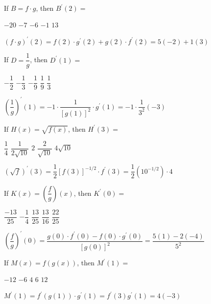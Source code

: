 \question
If $B=f \cdot g$, then $B^{\prime}(2)=$
\begin{choices}
  \choice $-20$
  \CorrectChoice $-7$
  \choice $-6$
  \choice $-1$
  \choice $13$
\end{choices}
\begin{solution}
$(f \cdot g)^{\prime}(2)=f(2) \cdot g^{\prime}(2)+g(2) \cdot f^{\prime}(2)=5(-2)+1(3)$
\end{solution}





\newpage




\question
If $D=\dfrac{1}{g}$, then $D^{\prime}(1)=$
\begin{choices}
  \choice $-\dfrac{1}{2}$
  \choice $-\dfrac{1}{3}$
  \choice $-\dfrac{1}{9}$
  \choice $\dfrac{1}{9}$
  \CorrectChoice $\dfrac{1}{3}$
\end{choices}
\begin{solution}
$\left(\dfrac{1}{g}\right)^{\prime}(1)=-1 \cdot \dfrac{1}{[g(1)]^{2}} \cdot g^{\prime}(1)=-1 \cdot \dfrac{1}{3^{2}}(-3)$
\end{solution}

\question
If $H(x)=\sqrt{f(x)}$, then $H^{\prime}(3)=$
\begin{choices}
  \choice $\dfrac{1}{4}$
  \choice $\dfrac{1}{2 \sqrt{10}}$
  \choice $2$
  \CorrectChoice $\dfrac{2}{\sqrt{10}}$
  \choice $4 \sqrt{10}$
\end{choices}
\begin{solution}
$(\sqrt{f})^{\prime}(3)=\dfrac{1}{2}[f(3)]^{-1 / 2} \cdot f^{\prime}(3)=\dfrac{1}{2}\left(10^{-1 / 2}\right) \cdot 4$
\end{solution}

\question
If $K(x)=\left(\dfrac{f}{g}\right)(x)$, then $K^{\prime}(0)=$
\begin{choices}
  \choice $\dfrac{-13}{25}$
  \choice $-\dfrac{1}{4}$
  \CorrectChoice $\dfrac{13}{25}$
  \choice $\dfrac{13}{16}$
  \choice $\dfrac{22}{25}$
\end{choices}
\begin{solution}
$\left(\dfrac{f}{g}\right)^{\prime}(0)=\dfrac{g(0) \cdot f^{\prime}(0)-f(0) \cdot g^{\prime}(0)}{[g(0)]^{2}}=\dfrac{5(1)-2(-4)}{5^{2}}$
\end{solution}


\newpage



\question
If $M(x)=f(g(x))$, then $M^{\prime}(1)=$
\begin{choices}
  \CorrectChoice $-12$
  \choice $-6$
  \choice $4$
  \choice $6$
  \choice $12$
\end{choices}
\begin{solution}
$M^{\prime}(1)=f^{\prime}(g(1)) \cdot g^{\prime}(1)=f^{\prime}(3) g^{\prime}(1)=4(-3)$
\end{solution}

